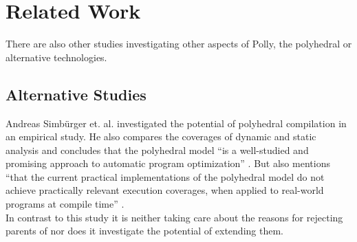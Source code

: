 \chapter{Related Work}
There are also other studies investigating other aspects of Polly, the polyhedral or alternative technologies.

\section{Alternative Studies}
Andreas Simbürger et. al. \cite{PolyhedralEmpiricalStudy} investigated the potential of polyhedral compilation in an empirical study.
He also compares the coverages of dynamic and static analysis and concludes that the polyhedral model \enquote{is a well-studied and promising approach to automatic program optimization} \cite{PolyhedralEmpiricalStudy}.
But also mentions \enquote{that the current practical implementations of the polyhedral model do not achieve practically relevant execution coverages, when applied to real-world programs at compile time} \cite{PolyhedralEmpiricalStudy}.\\
In contrast to this study it is neither taking care about the reasons for rejecting parents of \scops nor does it investigate the potential of extending them.

